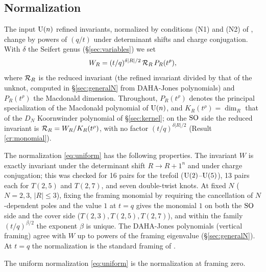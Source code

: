 \subsection{Normalization}\label{sec:uniform}
The input $\mathrm{U}(n)$ refined invariants, normalized by conditions (N1) and (N2) of \cite{KN17}, change by powers of $(q/t)$ under determinant shifts and charge conjugation. With $\delta$ the Seifert genus (\S\ref{sec:variables}) we set
\begin{equation}\label{eq:uniform}
W_R = (t/q)^{\delta |R|/2}\, \mathcal{R}_R\, P_R(t^\rho),
\end{equation}
where $\mathcal{R}_R$ is the reduced invariant (the refined invariant divided by that of the unknot, computed in \S\ref{sec:generalN} from DAHA-Jones polynomials) and $P_R(t^\rho)$ the Macdonald dimension. Throughout, $P_R(t^\rho)$ denotes the principal specialization of the Macdonald polynomial of $\mathrm{U}(n)$, and $K_R(t^\rho) = \dim_R$ that of the $D_N$ Koornwinder polynomial of \S\ref{sec:kernel}; on the $\mathrm{SO}$ side the reduced invariant is $\mathcal{R}_R = W_R/K_R(t^\rho)$, with no factor $(t/q)^{\delta|R|/2}$ (Result \ref{cr:monomial}).

\begin{result}\label{cr:uniform}
The normalization \eqref{eq:uniform} has the following properties. The invariant $W$ is exactly invariant under the determinant shift $R \to R + 1^n$ and under charge conjugation; this was checked for 16 pairs for the trefoil ($\mathrm{U}(2)$--$\mathrm{U}(5)$), 13 pairs each for $T(2,5)$ and $T(2,7)$, and seven double-twist knots. At fixed $N$ ($N = 2, 3$, $|R| \le 3$), fixing the framing monomial by requiring the cancellation of $N$-dependent poles and the value $1$ at $t = q$ gives the monomial $1$ on both the $\mathrm{SO}$ side and the cover side ($T(2,3), T(2,5), T(2,7)$), and within the family $(t/q)^{\beta/2}$ the exponent $\beta$ is unique. The DAHA-Jones polynomials (vertical framing) agree with $W$ up to powers of the framing eigenvalue (\S\ref{sec:generalN}). At $t = q$ the normalization is the standard framing of \cite{Marino09}.
\end{result}
\begin{hypothesis}\label{hyp:framing}
The uniform normalization \eqref{eq:uniform} is the normalization at framing zero.
\end{hypothesis}

